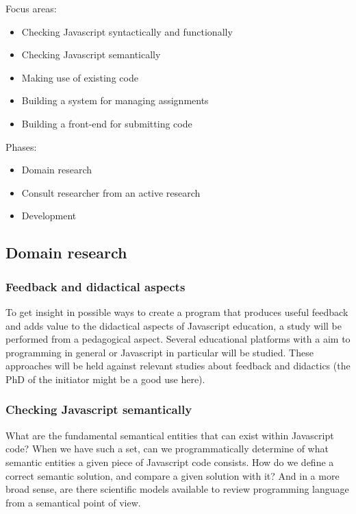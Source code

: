 \documentclass{article}
\begin{document}
Focus areas:
\begin{itemize}
  \item Checking Javascript syntactically and functionally
  \item Checking Javascript semantically
  \item Making use of existing code
  \item Building a system for managing assignments
  \item Building a front-end for submitting code
\end{itemize}

Phases:
\begin{itemize}
  \item Domain research
  \item Consult researcher from an active research
  \item Development
\end{itemize}


\subsection{Domain research}

\subsubsection{Feedback and didactical aspects}
To get insight in possible ways to create a program that produces useful feedback and adds value to the didactical aspects of Javascript education, a study will be performed from a pedagogical aspect. Several educational platforms with a aim to programming in general or Javascript in particular will be studied. These approaches will be held against relevant studies about feedback and didactics (the PhD of the initiator might be a good use here).
\subsubsection{Checking Javascript semantically}
What are the fundamental semantical entities that can exist within Javascript code? When we have such a set, can we programmatically determine of what semantic entities a given piece of Javascript code consists. How do we define a correct semantic solution, and compare a given solution with it? And in a more broad sense, are there scientific models available to review programming language from a semantical point of view.
\end{document}
